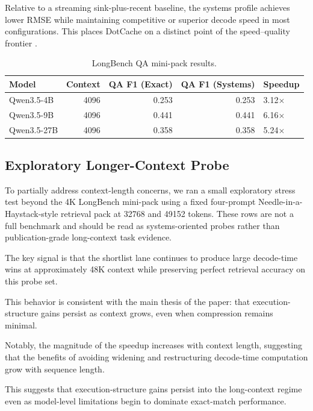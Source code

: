 \documentclass[11pt]{article}
\begin{document}
Relative to a streaming sink-plus-recent baseline, the systems profile achieves lower RMSE while maintaining competitive or superior decode speed in most configurations. This places DotCache on a distinct point of the speed--quality frontier \cite{streamingllm}.

\begin{table}[H]
\centering
\small
\setlength{\tabcolsep}{6pt}
\begin{tabular}{@{}l r r r l@{}}
\toprule
Model & Context & QA F1 (Exact) & QA F1 (Systems) & Speedup \\
\midrule
Qwen3.5-4B  & 4096 & 0.253 & 0.253 & 3.12$\times$ \\
Qwen3.5-9B  & 4096 & 0.441 & 0.441 & 6.16$\times$ \\
Qwen3.5-27B & 4096 & 0.358 & 0.358 & 5.24$\times$ \\
\bottomrule
\end{tabular}
\caption{LongBench QA mini-pack results.}
\label{tab:longbench}
\end{table}

\subsection{Exploratory Longer-Context Probe}

To partially address context-length concerns, we ran a small exploratory stress test beyond the 4K LongBench mini-pack using a fixed four-prompt Needle-in-a-Haystack-style retrieval pack at 32768 and 49152 tokens. These rows are not a full benchmark and should be read as systems-oriented probes rather than publication-grade long-context task evidence.

The key signal is that the shortlist lane continues to produce large decode-time wins at approximately 48K context while preserving perfect retrieval accuracy on this probe set.

This behavior is consistent with the main thesis of the paper: that execution-structure gains persist as context grows, even when compression remains minimal.

Notably, the magnitude of the speedup increases with context length, suggesting that the benefits of avoiding widening and restructuring decode-time computation grow with sequence length.

This suggests that execution-structure gains persist into the long-context regime even as model-level limitations begin to dominate exact-match performance.
\end{document}
